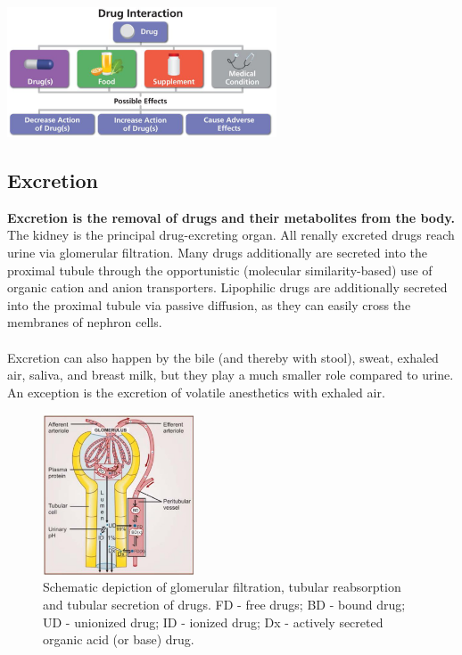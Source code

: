 \documentclass{book}
\begin{document}
\includegraphics[width=0.6\textwidth, center]{images/image7.png}


\subsection{Excretion}
\textbf{Excretion is the removal of drugs and their metabolites from the body.}
The kidney is the principal drug-excreting organ. 
All renally excreted drugs reach urine via glomerular filtration. Many drugs additionally are secreted into the proximal tubule through the opportunistic (molecular similarity-based) use of organic cation and anion transporters. 
Lipophilic drugs are additionally secreted into the proximal tubule via passive diffusion, as they can easily cross the membranes of nephron cells.
\\
\\
Excretion can also happen by the bile (and thereby with stool), sweat, exhaled air, saliva, and breast milk, but they play a much smaller role compared to urine.
An exception is the excretion of volatile anesthetics with exhaled air.

\begin{figure}

    \includegraphics[width=0.4\textwidth, center]{images/image8.png}
    \caption{Schematic depiction of glomerular filtration, tubular reabsorption and tubular secretion of drugs. FD - free drugs; BD - bound drug; UD - unionized drug; ID - ionized drug; Dx - actively secreted organic acid (or base) drug.}
    
\end{figure}
\end{document}
